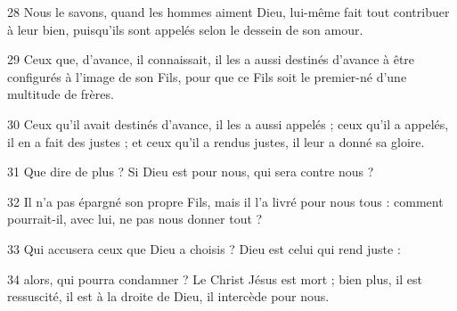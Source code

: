 28 Nous le savons, quand les hommes aiment Dieu, lui-même fait tout contribuer à leur bien, puisqu'ils sont appelés selon le dessein de son amour.

29 Ceux que, d’avance, il connaissait, il les a aussi destinés d’avance à être configurés à l’image de son Fils, pour que ce Fils soit le premier-né d’une multitude de frères.

30 Ceux qu’il avait destinés d’avance, il les a aussi appelés ; ceux qu’il a appelés, il en a fait des justes ; et ceux qu’il a rendus justes, il leur a donné sa gloire.

31 Que dire de plus ? Si Dieu est pour nous, qui sera contre nous ?

32 Il n’a pas épargné son propre Fils, mais il l’a livré pour nous tous : comment pourrait-il, avec lui, ne pas nous donner tout ?

33 Qui accusera ceux que Dieu a choisis ? Dieu est celui qui rend juste :

34 alors, qui pourra condamner ? Le Christ Jésus est mort ; bien plus, il est ressuscité, il est à la droite de Dieu, il intercède pour nous.
